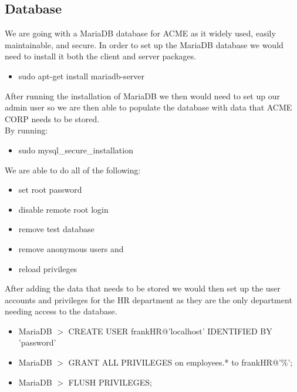 
\subsection{Database}
We are going with a MariaDB database for ACME as it widely used, easily 
maintainable, and secure. In order to set up the MariaDB database we would
need to install it both the client and server packages.

\begin{itemize}
\item sudo apt-get install mariadb-server
\end{itemize}

\noindent After running the installation of MariaDB we then would need to set 
up our admin user so we are then able to populate the database with data that 
ACME CORP needs to be stored. \\

\noindent By running:

\begin{itemize}
\item sudo mysql\_secure\_installation \\
\end{itemize}

\vspace{-1em}

\noindent We are able to do all of the following: 

\begin{itemize}
\item set root password
\item disable remote root login
\item remove test database
\item remove anonymous users and
\item reload privileges
\end{itemize}

\noindent After adding the data that needs to be stored we would then set up 
the user accounts and privileges for the HR department as they are the only 
department needing access to the database.

\begin{itemize}

\item MariaDB $>$ CREATE USER frankHR@'localhost' IDENTIFIED BY 'password'

\item MariaDB $>$ GRANT ALL PRIVILEGES on employees.* to frankHR@'\%';

\item MariaDB $>$ FLUSH PRIVILEGES; 

\end{itemize}

